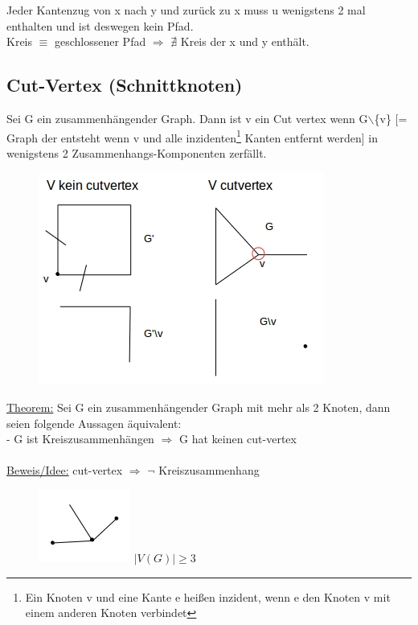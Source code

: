 Jeder Kantenzug von x nach y und zurück zu x muss u wenigstens 2 mal enthalten und ist deswegen kein Pfad.\\
Kreis $\equiv$ geschlossener Pfad $\Rightarrow$ $\nexists$ Kreis der x und y enthält.

\subsection{Cut-Vertex (Schnittknoten)}
Sei G ein zusammenhängender Graph. Dann ist v ein Cut vertex wenn G$\backslash$\{v\} [= Graph der entsteht wenn v und alle inzidenten\footnote{Ein Knoten v und eine Kante e heißen inzident, wenn e den Knoten v mit einem anderen Knoten verbindet} Kanten entfernt werden] in wenigstens 2 Zusammenhangs-Komponenten zerfällt.
\begin{figure}[htp]
\centering
\includegraphics[scale=1.00]{lectures/161021/pix/pic3.jpg}
\end{figure}

\underline{Theorem:} Sei G ein zusammenhängender Graph mit mehr als 2 Knoten, dann seien folgende Aussagen äquivalent:\\
 - G ist Kreiszusammenhängen $\Rightarrow$ G hat keinen cut-vertex
\\\\
\underline{Beweis/Idee:}
cut-vertex $\Rightarrow$ $\neg$ Kreiszusammenhang
\begin{figure}[htp]
\centering
\includegraphics[scale=1.00]{lectures/161021/pix/pic4.jpg}
$|V(G)| \geq 3$
\end{figure}

